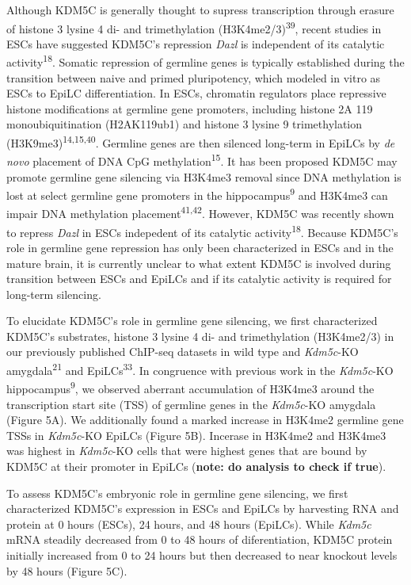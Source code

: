 \documentclass[
]{article}
\begin{document}
Although KDM5C is generally thought to supress transcription through
erasure of histone 3 lysine 4 di- and trimethylation
(H3K4me2/3)\textsuperscript{39}, recent studies in ESCs have suggested
KDM5C's repression \emph{Dazl} is independent of its catalytic
activity\textsuperscript{18}. Somatic repression of germline genes is
typically established during the transition between naive and primed
pluripotency, which modeled in vitro as ESCs to EpiLC differentiation.
In ESCs, chromatin regulators place repressive histone modifications at
germline gene promoters, including histone 2A 119 monoubiquitination
(H2AK119ub1) and histone 3 lysine 9 trimethylation
(H3K9me3)\textsuperscript{14,15,40}. Germline genes are then silenced
long-term in EpiLCs by \emph{de novo} placement of DNA CpG
methylation\textsuperscript{15}. It has been proposed KDM5C may promote
germline gene silencing via H3K4me3 removal since DNA methylation is
lost at select germline gene promoters in the
hippocampus\textsuperscript{9} and H3K4me3 can impair DNA methylation
placement\textsuperscript{41,42}. However, KDM5C was recently shown to
repress \emph{Dazl} in ESCs indepedent of its catalytic
activity\textsuperscript{18}. Because KDM5C's role in germline gene
repression has only been characterized in ESCs and in the mature brain,
it is currently unclear to what extent KDM5C is involved during
transition between ESCs and EpiLCs and if its catalytic activity is
required for long-term silencing.

To elucidate KDM5C's role in germline gene silencing, we first
characterized KDM5C's substrates, histone 3 lysine 4 di- and
trimethylation (H3K4me2/3) in our previously published ChIP-seq datasets
in wild type and \emph{Kdm5c}-KO amygdala\textsuperscript{21} and
EpiLCs\textsuperscript{33}. In congruence with previous work in the
\emph{Kdm5c}-KO hippocampus\textsuperscript{9}, we observed aberrant
accumulation of H3K4me3 around the transcription start site (TSS) of
germline genes in the \emph{Kdm5c}-KO amygdala (Figure 5A). We
additionally found a marked increase in H3K4me2 germline gene TSSs in
\emph{Kdm5c}-KO EpiLCs (Figure 5B). Incerase in H3K4me2 and H3K4me3 was
highest in \emph{Kdm5c}-KO cells that were highest genes that are bound
by KDM5C at their promoter in EpiLCs (\textbf{note: do analysis to check
if true}).

To assess KDM5C's embryonic role in germline gene silencing, we first
characterized KDM5C's expression in ESCs and EpiLCs by harvesting RNA
and protein at 0 hours (ESCs), 24 hours, and 48 hours (EpiLCs). While
\emph{Kdm5c} mRNA steadily decreased from 0 to 48 hours of
diferentiation, KDM5C protein initially increased from 0 to 24 hours but
then decreased to near knockout levels by 48 hours (Figure 5C).
\end{document}

